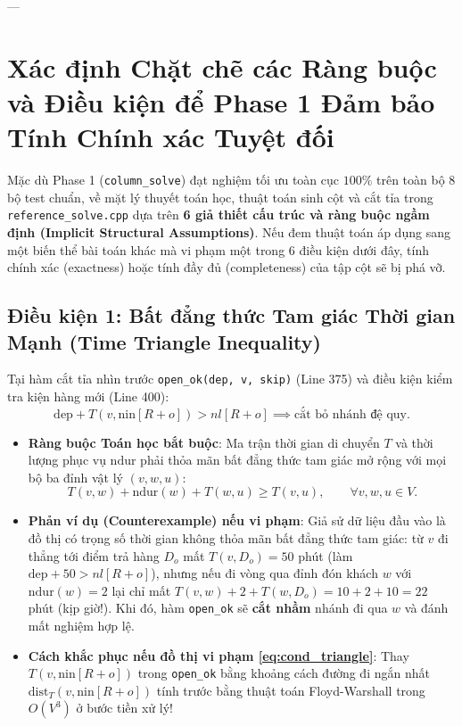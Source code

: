 \documentclass[11pt,a4paper]{article}
\theoremstyle{definition}
\begin{document}
---

\section{Xác định Chặt chẽ các Ràng buộc và Điều kiện để Phase 1 Đảm bảo Tính Chính xác Tuyệt đối}

Mặc dù Phase 1 (\texttt{column\_solve}) đạt nghiệm tối ưu toàn cục $100\%$ trên toàn bộ 8 bộ test chuẩn, về mặt lý thuyết toán học, thuật toán sinh cột và cắt tỉa trong \texttt{reference\_solve.cpp} dựa trên \textbf{6 giả thiết cấu trúc và ràng buộc ngầm định (Implicit Structural Assumptions)}. Nếu đem thuật toán áp dụng sang một biến thể bài toán khác mà vi phạm một trong 6 điều kiện dưới đây, tính chính xác (exactness) hoặc tính đầy đủ (completeness) của tập cột sẽ bị phá vỡ.

\subsection{Điều kiện 1: Bất đẳng thức Tam giác Thời gian Mạnh (Time Triangle Inequality)}
Tại hàm cắt tỉa nhìn trước \texttt{open\_ok(dep, v, skip)} (Line 375) và điều kiện kiểm tra kiện hàng mới (Line 400):
\[
    \text{dep} + T(v, \text{nin}[R+o]) > nl[R+o] \implies \text{cắt bỏ nhánh đệ quy.}
\]
\begin{itemize}[leftmargin=1.5em]
    \item \textbf{Ràng buộc Toán học bắt buộc}: Ma trận thời gian di chuyển $T$ và thời lượng phục vụ $\text{ndur}$ phải thỏa mãn bất đẳng thức tam giác mở rộng với mọi bộ ba đỉnh vật lý $(v, w, u)$:
    \begin{equation}
        T(v, w) + \text{ndur}(w) + T(w, u) \ge T(v, u), \qquad \forall v, w, u \in V.
        \label{eq:cond_triangle}
    \end{equation}
    \item \textbf{Phản ví dụ (Counterexample) nếu vi phạm}: Giả sử dữ liệu đầu vào là đồ thị có trọng số thời gian không thỏa mãn bất đẳng thức tam giác: từ $v$ đi thẳng tới điểm trả hàng $D_o$ mất $T(v, D_o) = 50$ phút (làm $\text{dep} + 50 > nl[R+o]$), nhưng nếu đi vòng qua đỉnh đón khách $w$ với $\text{ndur}(w) = 2$ lại chỉ mất $T(v, w) + 2 + T(w, D_o) = 10 + 2 + 10 = 22$ phút (kịp giờ!). Khi đó, hàm \texttt{open\_ok} sẽ \textbf{cắt nhầm} nhánh đi qua $w$ và đánh mất nghiệm hợp lệ.
    \item \textbf{Cách khắc phục nếu đồ thị vi phạm \eqref{eq:cond_triangle}}: Thay $T(v, \text{nin}[R+o])$ trong \texttt{open\_ok} bằng khoảng cách đường đi ngắn nhất $\text{dist}_T(v, \text{nin}[R+o])$ tính trước bằng thuật toán Floyd-Warshall trong $O(V^3)$ ở bước tiền xử lý!
\end{itemize}
\end{document}
